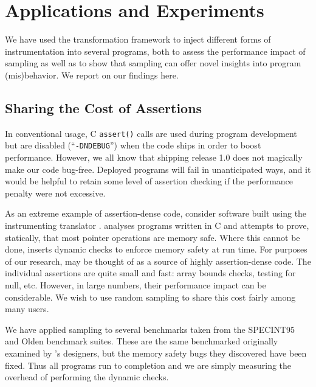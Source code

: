 \section{Applications and Experiments}
\label{sec:applications}

We have used the transformation framework to inject different forms of
instrumentation into several programs, both to assess the performance
impact of sampling as well as to show that sampling can offer novel
insights into program (mis)behavior.  We report on our findings here.

\subsection{Sharing the Cost of Assertions}

In conventional usage, C \texttt{assert()} calls are used during
program development but are disabled (``\texttt{-DNDEBUG}'') when the
code ships in order to boost performance.  However, we all know that
shipping release 1.0 does not magically make our code bug-free.
Deployed programs will fail in unanticipated ways, and it would be
helpful to retain some level of assertion checking if the performance
penalty were not excessive.

As an extreme example of assertion-dense code, consider software built
using the \CCured instrumenting translator \cite{POPL_'02*128}.
\CCured analyses programs written in C and attempts to prove,
statically, that most pointer operations are memory safe.  Where this
cannot be done, \CCured inserts dynamic checks to enforce memory
safety at run time.  For purposes of our research, \CCured may be
thought of as a source of highly assertion-dense code.  The individual
assertions are quite small and fast: array bounds checks, testing for
null, etc.  However, in large numbers, their performance impact can be
considerable.  We wish to use random sampling to share this cost
fairly among many users.

We have applied sampling to several benchmarks taken from the
SPECINT95 \cite{SPEC95} and Olden \cite{Carlisle:1996:OPPWDDSDMM}
benchmark suites.  These are the same benchmarked originally examined
by \CCured's designers, but the memory safety bugs they discovered
have been fixed.  Thus all programs run to completion and we are
simply measuring the overhead of performing the dynamic checks.

